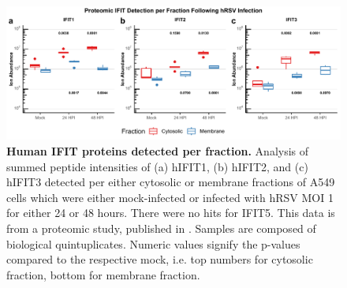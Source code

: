 \begin{figure}
    \centering
    \includegraphics[width=1\linewidth]{06. Chapter 1/Figs/02. Bioinformatics Analysis/01. merged_proteomics.pdf}
    \caption[Human IFIT proteins detected per fraction.]{\textbf{Human IFIT proteins detected per fraction.} Analysis of summed peptide intensities of (a) hIFIT1, (b) hIFIT2, and (c) hIFIT3 detected per either cytosolic or membrane fractions of A549 cells which were either mock-infected or infected with hRSV MOI 1 for either 24 or 48 hours. There were no hits for IFIT5. This data is from a proteomic study, published in \cite{Jobe2023ViralCondensates}. Samples are composed of biological quintuplicates. Numeric values signify the p-values compared to the respective mock, i.e. top numbers for cytosolic fraction, bottom for membrane fraction.}
    \label{fig:Human IFIT proteomics}
\end{figure}

